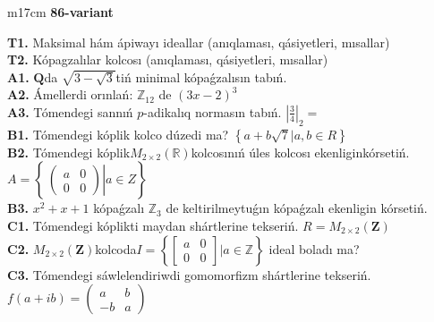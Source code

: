\documentclass{article}
\begin{document}
\begin{tabular}{m{17cm}}
\textbf{86-variant}
\newline

\textbf{T1.} Maksimal hám ápiwayı ideallar (anıqlaması, qásiyetleri, mısallar) \\
\textbf{T2.} Kópagzalılar kolcosı (anıqlaması, qásiyetleri, mısallar) \\
\textbf{A1.} \(\mathbf{Q}\)da \(\sqrt{3 - \sqrt{3}}\)tiń minimal kópaǵzalısın tabıń. \\
\textbf{A2.} Ámellerdi orınlań: \(\mathbb{Z}_{12}\) de \((3x - 2)^{3}\) \\
\textbf{A3.} Tómendegi sannıń \(p\)-adikalıq normasın tabıń. \(|\frac{3}{4}|_{2} =\) \\
\textbf{B1.} Tómendegi kóplik kolco dúzedi ma? \(\left\{ a + b\sqrt{7}|a,b \in R \right\}\) \\
\textbf{B2.} Tómendegi kóplik\(M_{2 \times 2}\left( \mathbb{R} \right)\)kolcosınıń úles kolcosı ekenliginkórsetiń. \(A = \left\{ \left. \ \begin{pmatrix}
a & 0 \\
0 & 0
\end{pmatrix} \right|a \in Z \right\}\) \\
\textbf{B3.} \(x^{2} + x + 1\) kópaǵzalı \(\mathbb{Z}_{3}\) de keltirilmeytuǵın kópaǵzalı ekenligin kórsetiń. \\
\textbf{C1.} Tómendegi kóplikti maydan shártlerine tekseriń. \(R = M_{2 \times 2}\left( \mathbf{Z} \right)\) \\
\textbf{C2.} \(M_{2 \times 2}\left( \mathbf{Z} \right)\)kolcoda\(I = \left\{ \begin{bmatrix}
a & 0 \\
0 & 0
\end{bmatrix}|a\mathbb{\in Z} \right\}\) ideal boladı ma? \\
\textbf{C3.} Tómendegi sáwlelendiriwdi gomomorfizm shártlerine tekseriń. \(f(a + ib) = \begin{pmatrix}
a & b \\
 - b & a
\end{pmatrix}\) \\

\end{tabular}
\vspace{1cm}
\end{document}
